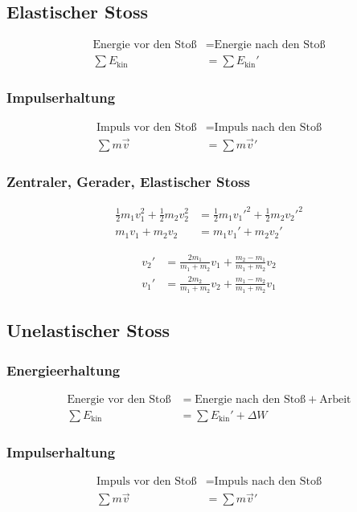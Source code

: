 \subsection{Elastischer Stoss}

\begin{align*}
\text{Energie vor den Stoß} &= \text{Energie nach den Stoß}\nonumber\\
\sum E_{\text{kin}}&=\sum E_{\text{kin}}'
\end{align*}


\subsubsection*{Impulserhaltung}
\begin{align*}
\text{Impuls vor den Stoß} &= \text{Impuls nach den Stoß}\nonumber\\
\sum m\vec{v}&= \sum m\vec{v}'
\end{align*}


\subsubsection*{Zentraler, Gerader, Elastischer Stoss}
\begin{align*}
\frac{1}{2}m_1v_1^2+\frac{1}{2}m_2v_2^2&=\frac{1}{2}m_1v_1'^2+\frac{1}{2}m_2v_2'^2\\
m_1v_1+m_2v_2&=m_1v_1'+m_2v_2'
\end{align*}

\begin{align*}
v_2'&=\frac{2m_1}{m_1+m_2}v_1+\frac{m_2-m_1}{m_1+m_2}v_2\\
v_1'&=\frac{2m_2}{m_1+m_2}v_2+\frac{m_1-m_2}{m_1+m_2}v_1
\end{align*}


\subsection{Unelastischer Stoss}

\subsubsection*{Energieerhaltung}
\begin{align*}
\text{Energie vor den Stoß} &= \text{Energie nach den Stoß}+\text{Arbeit}\nonumber\\
\sum E_{\text{kin}}&=\sum E_{\text{kin}}'+\Delta W
\end{align*}


\subsubsection*{Impulserhaltung}
\begin{align*}
\text{Impuls vor den Stoß} &= \text{Impuls nach den Stoß}\nonumber\\
\sum m\vec{v}&= \sum m\vec{v}'
\end{align*}


